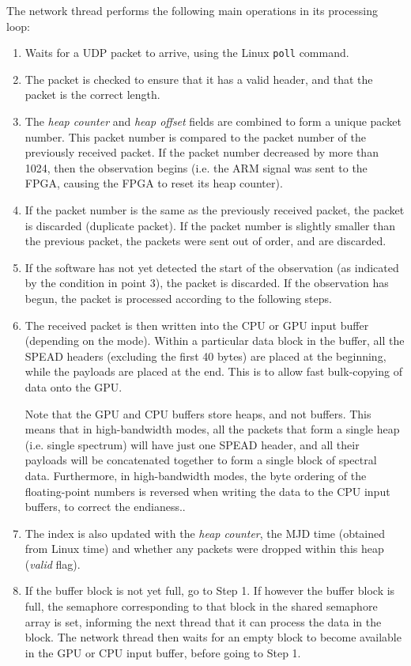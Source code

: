 \documentclass[11pt]{article} %
\begin{document}
The network thread performs the following main operations in its processing loop:
\begin{enumerate}
\item Waits for a UDP packet to arrive, using the Linux \texttt{poll} command.
\item The packet is checked to ensure that it has a valid header, and that the packet is the correct length.
\item The \emph{heap counter} and \emph{heap offset} fields are combined to form a unique packet number. This packet number is compared to the packet number of the previously received packet. If the packet number decreased by more than 1024, then the observation begins (i.e. the ARM signal was sent to the FPGA, causing the FPGA to reset its heap counter).
\item If the packet number is the same as the previously received packet, the packet is discarded (duplicate packet). If the packet number is slightly smaller than the previous packet, the packets were sent out of order, and are discarded.
\item If the software has not yet detected the start of the observation (as indicated by the condition in point 3), the packet is discarded. If the observation has begun, the packet is processed according to the following steps.
\item The received packet is then written into the CPU or GPU input buffer (depending on the mode). Within a particular data block in the buffer, all the SPEAD headers (excluding the first 40 bytes) are placed at the beginning, while the payloads are placed at the end. This is to allow fast bulk-copying of data onto the GPU.

Note that the GPU and CPU buffers store heaps, and not buffers. This means that in high-bandwidth modes, all the packets that form a single heap (i.e. single spectrum) will have just one SPEAD header, and all their payloads will be concatenated together to form a single block of spectral data. Furthermore, in high-bandwidth modes, the byte ordering of the floating-point numbers is reversed when writing the data to the CPU input buffers, to correct the endianess.. 
\item The index is also updated with the {\em heap counter}, the MJD time (obtained from Linux time) and whether any packets were dropped within this heap ({\em valid} flag).
\item If the buffer block is not yet full, go to Step 1. If however the buffer block is full, the semaphore corresponding to that block in the shared semaphore array is set, informing the next thread that it can process the data in the block. The network thread then waits for an empty block to become available in the GPU or CPU input buffer, before going to Step 1.
\end{enumerate}
\end{document}
